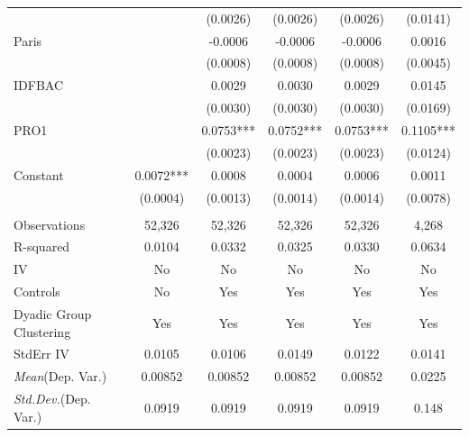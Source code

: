 \documentclass[]{article}
\begin{document}
\begin{tabular}{lccccc}
 &  & (0.0026) & (0.0026) & (0.0026) & (0.0141) \\
Paris &  & -0.0006 & -0.0006 & -0.0006 & 0.0016 \\
 &  & (0.0008) & (0.0008) & (0.0008) & (0.0045) \\
IDFBAC &  & 0.0029 & 0.0030 & 0.0029 & 0.0145 \\
 &  & (0.0030) & (0.0030) & (0.0030) & (0.0169) \\
PRO1 &  & 0.0753*** & 0.0752*** & 0.0753*** & 0.1105*** \\
 &  & (0.0023) & (0.0023) & (0.0023) & (0.0124) \\
Constant & 0.0072*** & 0.0008 & 0.0004 & 0.0006 & 0.0011 \\
 & (0.0004) & (0.0013) & (0.0014) & (0.0014) & (0.0078) \\
 &  &  &  &  &  \\
Observations & 52,326 & 52,326 & 52,326 & 52,326 & 4,268 \\
R-squared & 0.0104 & 0.0332 & 0.0325 & 0.0330 & 0.0634 \\
IV & No & No & No & No & No \\
Controls & No & Yes & Yes & Yes & Yes \\
Dyadic Group Clustering & Yes & Yes & Yes & Yes & Yes \\
StdErr IV & 0.0105 & 0.0106 & 0.0149 & 0.0122 & 0.0141 \\
\textit{Mean}(Dep. Var.) & 0.00852 & 0.00852 & 0.00852 & 0.00852 & 0.0225 \\
 \textit{Std.Dev.}(Dep. Var.) & 0.0919 & 0.0919 & 0.0919 & 0.0919 & 0.148 \\ \hline
\end{tabular}
\end{document}
